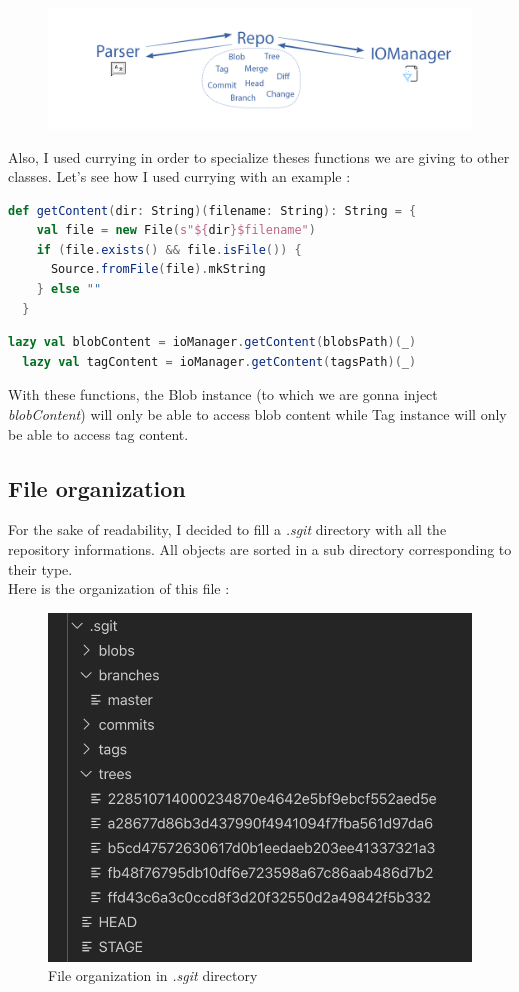\documentclass[11pt]{article}
\begin{document}
\begin{figure}[h!]
  \centering
  \includegraphics[width=\linewidth]{img/flowDetailled.png}
\end{figure}

Also, I used currying in order to specialize theses functions we are giving to other classes. Let's see how I used currying with an example :

\begin{lstlisting}[language=scala, caption=Function in IOManager]
  def getContent(dir: String)(filename: String): String = {
    val file = new File(s"${dir}$filename")
    if (file.exists() && file.isFile()) {
      Source.fromFile(file).mkString
    } else ""
  }
\end{lstlisting}

\begin{lstlisting}[language=scala, caption=Functions to be injected]
  lazy val blobContent = ioManager.getContent(blobsPath)(_)
  lazy val tagContent = ioManager.getContent(tagsPath)(_)
\end{lstlisting}

With these functions, the Blob instance (to which we are gonna inject \textit{blobContent}) will only be able to access blob content while Tag instance will only be able to access tag content.

\subsection{File organization}

For the sake of readability, I decided to fill a \textit{.sgit} directory with all the repository informations. All objects are sorted in a sub directory corresponding to their type.\\

Here is the organization of this file :
\begin{figure}[h!]
  \centering
  \includegraphics[width=0.5\linewidth]{img/fileOrganisation.png}
  \caption{File organization in \textit{.sgit} directory}
\end{figure}
\end{document}
